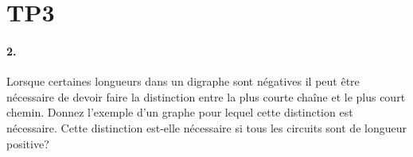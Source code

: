 
\section{TP3}

\paragraph{2. } Lorsque certaines longueurs dans un digraphe sont négatives il peut être nécessaire de devoir faire la distinction entre la plus courte chaîne et le plus court chemin. Donnez l'exemple d'un graphe pour lequel cette distinction est nécessaire. Cette distinction est-elle nécessaire si tous les circuits sont de longueur positive?


